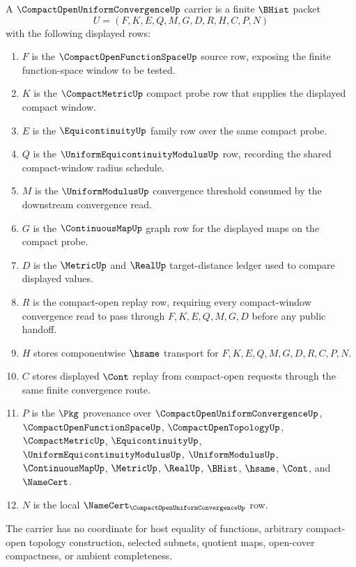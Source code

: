 \begin{definition}
\label{def:compact-open-uniform-convergence-carrier}
A $\CompactOpenUniformConvergenceUp$ carrier is a finite $\BHist$ packet
$$
U=(F,K,E,Q,M,G,D,R,H,C,P,N)
$$
with the following displayed rows:
\begin{enumerate}
\item $F$ is the $\CompactOpenFunctionSpaceUp$ source row, exposing the finite function-space window to be tested.
\item $K$ is the $\CompactMetricUp$ compact probe row that supplies the displayed compact window.
\item $E$ is the $\EquicontinuityUp$ family row over the same compact probe.
\item $Q$ is the $\UniformEquicontinuityModulusUp$ row, recording the shared compact-window radius schedule.
\item $M$ is the $\UniformModulusUp$ convergence threshold consumed by the downstream convergence read.
\item $G$ is the $\ContinuousMapUp$ graph row for the displayed maps on the compact probe.
\item $D$ is the $\MetricUp$ and $\RealUp$ target-distance ledger used to compare displayed values.
\item $R$ is the compact-open replay row, requiring every compact-window convergence read to pass through $F,K,E,Q,M,G,D$ before any public handoff.
\item $H$ stores componentwise $\hsame$ transport for $F,K,E,Q,M,G,D,R,C,P,N$.
\item $C$ stores displayed $\Cont$ replay from compact-open requests through the same finite convergence route.
\item $P$ is the $\Pkg$ provenance over $\CompactOpenUniformConvergenceUp$, $\CompactOpenFunctionSpaceUp$, $\CompactOpenTopologyUp$, $\CompactMetricUp$, $\EquicontinuityUp$, $\UniformEquicontinuityModulusUp$, $\UniformModulusUp$, $\ContinuousMapUp$, $\MetricUp$, $\RealUp$, $\BHist$, $\hsame$, $\Cont$, and $\NameCert$.
\item $N$ is the local $\NameCert_{\CompactOpenUniformConvergenceUp}$ row.
\end{enumerate}
The carrier has no coordinate for host equality of functions, arbitrary compact-open topology construction, selected subnets, quotient maps, open-cover compactness, or ambient completeness.
\end{definition}

